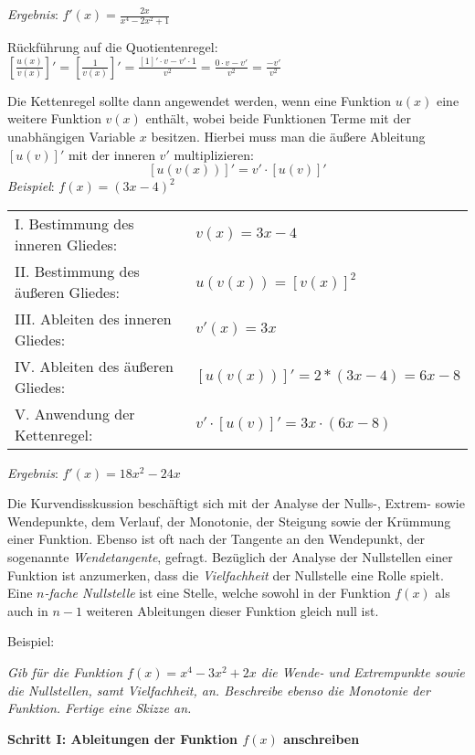 \emph{Ergebnis}: $f'(x) = \frac{2x}{x^4 - 2x^2 + 1}$

R\"{u}ckf\"{u}hrung auf die Quotientenregel: \hspace{1cm} $\left[\frac{u(x)}{v(x)}\right]' = \left[\frac{1}{v(x)}\right]' = \frac{[1]' \cdot v - v' \cdot 1}{v^2} = \frac{0 \cdot v - v'}{v^2} = \frac{-v'}{v^2}$


Die Kettenregel sollte dann angewendet werden, wenn eine Funktion $u(x)$ eine weitere Funktion $v(x)$ enth\"{a}lt, wobei beide Funktionen Terme mit der unabh\"{a}ngigen Variable $x$ besitzen. Hierbei muss man die \"{a}u\ss{}ere Ableitung $[u(v)]'$ mit der inneren $v'$ multiplizieren: $$[u(v(x))]' = v' \cdot [u(v)]'$$
\emph{Beispiel}: $f(x) = (3x - 4)^2$

\begin{tabular}{l l}
	I. Bestimmung des inneren Gliedes: & $v(x) = 3x - 4$
	\extrapar \\
	II. Bestimmung des \"{a}u\ss{}eren Gliedes: & $u(v(x)) = [v(x)]^2$
	\extrapar \\
	III. Ableiten des inneren Gliedes: & $v'(x) = 3x$
	\extrapar \\
	IV. Ableiten des \"{a}u\ss{}eren Gliedes: & $[u(v(x))]' = 2 * (3x - 4) = 6x - 8$
	\extrapar \\
	V. Anwendung der Kettenregel: & $v' \cdot [u(v)]' = 3x \cdot (6x - 8)$
\end{tabular}

\emph{Ergebnis}: $f'(x) = 18x^2 - 24x$


Die Kurvendisskussion besch\"{a}ftigt sich mit der Analyse der Nulls-, Extrem- sowie Wendepunkte, dem Verlauf, der Monotonie, der Steigung sowie der Kr\"{u}mmung einer Funktion. Ebenso ist oft nach der Tangente an den Wendepunkt, der sogenannte \emph{Wendetangente}, gefragt. Bez\"{u}glich der Analyse der Nullstellen einer Funktion ist anzumerken, dass die \emph{Vielfachheit} der Nullstelle eine Rolle spielt. Eine \emph{$n$-fache Nullstelle} ist eine Stelle, welche sowohl in der Funktion $f(x)$ als auch in $n-1$ weiteren Ableitungen dieser Funktion gleich null ist. 

Beispiel:

\emph{Gib f\"{u}r die Funktion $f(x) = x^4 - 3x^2 + 2x$ die Wende- und Extrempunkte sowie die Nullstellen, samt Vielfachheit, an. Beschreibe ebenso die Monotonie der Funktion. Fertige eine Skizze an.}

\textbf{Schritt I: Ableitungen der Funktion $f(x)$ anschreiben}

